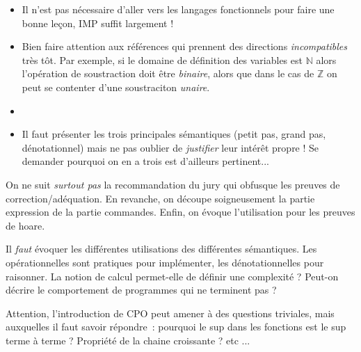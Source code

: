 \documentclass{article}
\begin{document}
\secpieges

\begin{itemize}
    \item Il n'est pas nécessaire d'aller vers les langages fonctionnels
        pour faire une bonne leçon, IMP suffit largement !
    \item Bien faire attention aux références qui prennent des directions 
        \emph{incompatibles} très tôt. Par exemple, si le domaine de définition
        des variables est $\mathbb{N}$ alors l'opération de soustraction 
        doit être \emph{binaire}, alors que dans le cas de $\mathbb{Z}$ on peut 
        se contenter d'une soustraciton \emph{unaire}.
    \item {}
    \item Il faut présenter les trois principales sémantiques (petit pas, grand
        pas, dénotationnel) mais ne pas oublier de \emph{justifier} leur intérêt
        propre ! Se demander pourquoi on en a trois est d'ailleurs pertinent...
\end{itemize}

\secidees

On ne suit \emph{surtout pas} la recommandation du jury qui obfusque les
preuves de correction/adéquation. En revanche, on découpe soigneusement la
partie expression de la partie commandes. Enfin, on évoque l'utilisation 
pour les preuves de hoare.

Il \emph{faut} évoquer les différentes utilisations des différentes
sémantiques. Les opérationnelles sont pratiques pour implémenter, les
dénotationnelles pour raisonner. La notion de calcul permet-elle de définir
une complexité ? Peut-on décrire le comportement de programmes qui ne
terminent pas ? 

Attention, l'introduction de CPO peut amener à des questions triviales, mais
auxquelles il faut savoir répondre~: pourquoi le sup dans les fonctions est
le sup terme à terme ? Propriété de la chaine croissante ? etc ...
\end{document}
